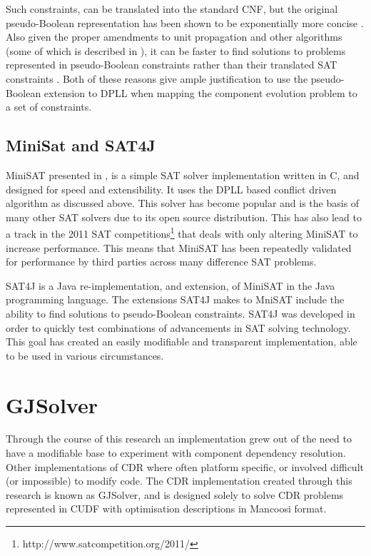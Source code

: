 Such constraints, can be translated into the standard CNF, but the original pseudo-Boolean representation has been shown to be exponentially more concise \citep{dixon2004automating}.
Also given the proper amendments to unit propagation and other algorithms (some of which is described in \cite{Sheini2006}), 
it can be faster to find solutions to problems represented in pseudo-Boolean constraints rather than their translated SAT constraints \citep{dixon2004automating}.
Both of these reasons give ample justification to use the pseudo-Boolean extension to DPLL when mapping the component evolution problem to a set of constraints. 
 
\subsection{MiniSat and SAT4J}
MiniSAT presented in \cite{een2003}, is a simple SAT solver implementation written in C, and designed for speed and extensibility.
It uses the DPLL based conflict driven algorithm as discussed above.
This solver has become popular and is the basis of many other SAT solvers due to its open source distribution.
This has also lead to a track in the 2011 SAT competitions\footnote{http://www.satcompetition.org/2011/} that deals with only altering MiniSAT to increase performance.
This means that MiniSAT has been repeatedly validated for performance by third parties across many difference SAT problems. 

SAT4J \citep{le2010sat4j} is a Java re-implementation, and extension, of MiniSAT in the Java programming language.
The extensions SAT4J makes to MniSAT include the ability to find solutions to pseudo-Boolean constraints.
SAT4J was developed in order to quickly test combinations of advancements in SAT solving technology.
This goal has created an easily modifiable and transparent implementation, able to be used in various circumstances.

\section{GJSolver}
Through the course of this research an implementation grew out of the need to have a modifiable base to experiment with component dependency resolution.
Other implementations of CDR where often platform specific, or involved difficult (or impossible) to modify code.
The CDR implementation created through this research is known as GJSolver, 
and is designed solely to solve CDR problems represented in CUDF with optimisation descriptions in Mancoosi format.

